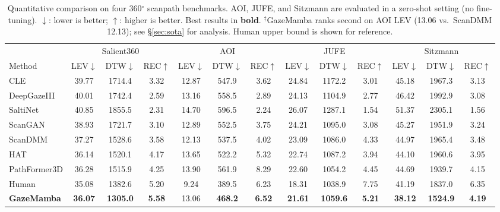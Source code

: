 \documentclass[sigconf]{acmart}
\begin{document}
\begin{table}[t]
  \centering
  \caption{Quantitative comparison on four 360$^\circ$ scanpath benchmarks. AOI, JUFE, and Sitzmann are evaluated in a zero-shot setting (no fine-tuning). $\downarrow$: lower is better; $\uparrow$: higher is better. Best results in \textbf{bold}. $^\ddagger$GazeMamba ranks second on AOI LEV (13.06 vs.\ ScanDMM 12.13); see §\ref{sec:sota} for analysis. Human upper bound is shown for reference.}
  \label{tab:sota}
  \setlength{\tabcolsep}{4.5pt}
  \begin{tabular}{lcccccccccccc}
    \toprule
    & \multicolumn{3}{c}{Salient360} & \multicolumn{3}{c}{AOI} & \multicolumn{3}{c}{JUFE} & \multicolumn{3}{c}{Sitzmann} \\
    \cmidrule(lr){2-4}\cmidrule(lr){5-7}\cmidrule(lr){8-10}\cmidrule(lr){11-13}
    Method & LEV$\downarrow$ & DTW$\downarrow$ & REC$\uparrow$ & LEV$\downarrow$ & DTW$\downarrow$ & REC$\uparrow$ & LEV$\downarrow$ & DTW$\downarrow$ & REC$\uparrow$ & LEV$\downarrow$ & DTW$\downarrow$ & REC$\uparrow$ \\
    \midrule
    CLE           & 39.77 & 1714.4 & 3.32 & 12.87 & 547.9 & 3.62 & 24.84 & 1172.2 & 3.01 & 45.18 & 1967.3 & 3.13 \\
    DeepGazeIII   & 40.01 & 1742.4 & 2.59 & 13.16 & 558.5 & 2.89 & 24.13 & 1104.9 & 2.77 & 46.42 & 1992.9 & 3.08 \\
    SaltiNet      & 40.85 & 1855.5 & 2.31 & 14.70 & 596.5 & 2.24 & 26.07 & 1287.1 & 1.54 & 51.37 & 2305.1 & 1.56 \\
    ScanGAN       & 38.93 & 1721.7 & 3.10 & 12.89 & 552.5 & 3.75 & 24.21 & 1095.0 & 3.08 & 45.27 & 1951.9 & 3.24 \\
    ScanDMM       & 37.27 & 1528.6 & 3.58 & 12.13 & 537.5 & 4.02 & 23.09 & 1086.0 & 4.33 & 44.97 & 1965.4 & 3.48 \\
    HAT           & 36.14 & 1520.1 & 4.17 & 13.65 & 522.2 & 5.32 & 22.74 & 1087.2 & 3.94 & 44.10 & 1960.6 & 3.95 \\
    PathFormer3D  & 36.28 & 1515.9 & 4.25 & 13.90 & 561.9 & 8.29 & 22.60 & 1054.2 & 4.45 & 44.69 & 1939.7 & 4.15 \\
    Human         & 35.08 & 1382.6 & 5.20 & 9.24  & 389.5 & 6.23 & 18.31 & 1038.9 & 7.75 & 41.19 & 1837.0 & 6.35 \\
    \midrule
    \textbf{GazeMamba} & \textbf{36.07} & \textbf{1305.0} & \textbf{5.58} & 13.06 & \textbf{468.2} & \textbf{6.52} & \textbf{21.61} & \textbf{1059.6} & \textbf{5.21} & \textbf{38.12} & \textbf{1524.9} & \textbf{4.19} \\
    \bottomrule
  \end{tabular}
\end{table}
\end{document}
